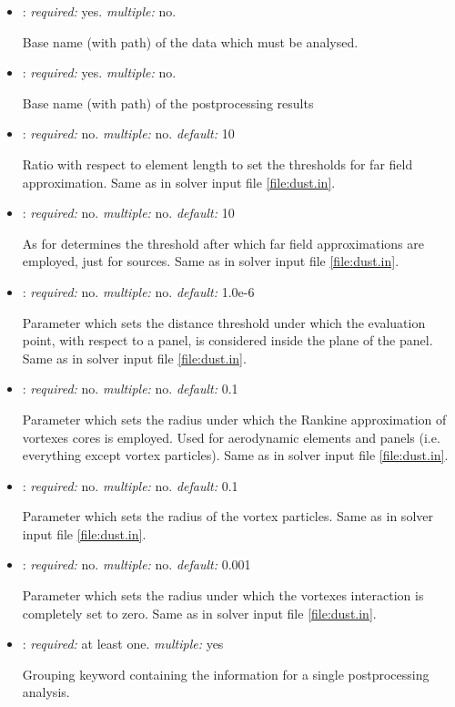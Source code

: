 \begin{itemize}
\item {}: \textit{required:} yes. \textit{multiple:} no. 

Base name (with path) of the data which must be analysed.

\item {}: \textit{required:} yes. \textit{multiple:} no. 

Base name (with path) of the postprocessing results

\item {}: \textit{required:} no. \textit{multiple:} no. \textit{default:} 10

Ratio with respect to element length to set the thresholds for far field approximation. Same as in solver input file \ref{file:dust.in}.

\item {}: \textit{required:} no. \textit{multiple:} no. \textit{default:} 10

As for  determines the threshold after which far field approximations are employed, just for sources. Same as in solver input file \ref{file:dust.in}.

\item {}: \textit{required:} no. \textit{multiple:} no. \textit{default:} 1.0e-6

Parameter which sets the distance threshold under which the evaluation point, with respect to a panel, is considered inside the plane of the panel. Same as in solver input file \ref{file:dust.in}.

\item {}: \textit{required:} no. \textit{multiple:} no. \textit{default:} 0.1

Parameter which sets the radius under which the Rankine approximation of vortexes cores is employed. Used for aerodynamic elements and panels (i.e. everything except vortex particles). Same as in solver input file \ref{file:dust.in}.

\item {}: \textit{required:} no. \textit{multiple:} no. \textit{default:} 0.1

Parameter which sets the radius of the vortex particles. Same as in solver input file \ref{file:dust.in}.

\item {}: \textit{required:} no. \textit{multiple:} no. \textit{default:} 0.001

Parameter which sets the radius under which the vortexes interaction is completely set to zero. Same as in solver input file \ref{file:dust.in}.

\item {}: \textit{required:} at least one. \textit{multiple:} yes

Grouping keyword containing the information for a single postprocessing analysis.

\end{itemize}

